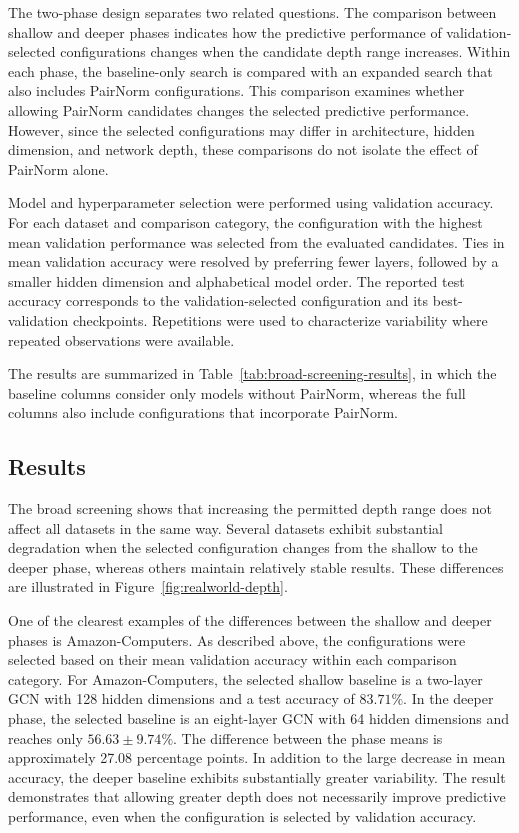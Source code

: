 \documentclass[english]{lni}
\begin{document}
The two-phase design separates two related questions. The comparison between shallow and deeper phases indicates how the predictive performance of validation-selected configurations changes when the candidate depth range increases. Within each phase, the baseline-only search is compared with an expanded search that also includes PairNorm configurations. This comparison examines whether allowing PairNorm candidates changes the selected predictive performance. However, since the selected configurations may differ in architecture, hidden dimension, and network depth, these comparisons do not isolate the effect of PairNorm alone.

Model and hyperparameter selection were performed using validation accuracy. For each dataset and comparison category, the configuration with the highest mean validation performance was selected from the evaluated candidates. Ties in mean validation accuracy were resolved by preferring fewer layers, followed by a smaller hidden dimension and alphabetical model order. The reported test accuracy corresponds to the validation-selected configuration and its best-validation checkpoints. Repetitions were used to characterize variability where repeated observations were available.

The results are summarized in Table~\ref{tab:broad-screening-results}, in which the baseline columns consider only models without PairNorm, whereas the full columns also include configurations that incorporate PairNorm. 

\subsection{Results}
\label{sec:broad-screening-results}

The broad screening shows that increasing the permitted depth range does not affect all datasets in the same way. Several datasets exhibit substantial degradation when the selected configuration changes from the shallow to the deeper phase, whereas others maintain relatively stable results. These differences are illustrated in Figure~\ref{fig:realworld-depth}.

One of the clearest examples of the differences between the shallow and deeper phases is Amazon-Computers. As described above, the configurations were selected based on their mean validation accuracy within each comparison category. For Amazon-Computers, the selected shallow baseline is a two-layer GCN with 128 hidden dimensions and a test accuracy of $83.71\%$. In the deeper phase, the selected baseline is an eight-layer GCN with 64 hidden dimensions and reaches only $56.63\pm9.74\%$. The difference between the phase means is approximately 27.08 percentage points. In addition to the large decrease in mean accuracy, the deeper baseline exhibits substantially greater variability. The result demonstrates that allowing greater depth does not necessarily improve predictive performance, even when the configuration is selected by validation accuracy.
\end{document}
